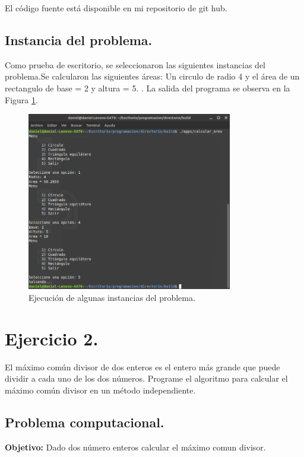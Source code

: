 \documentclass[12pt,letterpaper]{article}
\begin{document}
{El código fuente está disponible en mi repositorio de git hub. \cite{url:calcular_area}

\subsection{Instancia del problema.}
Como prueba de escritorio, se seleccionaron las siguientes instancias del problema.Se calcularon las siguientes \'areas: Un circulo de radio 4 y el \'area de un rectangulo de base = 2 y altura = 5. . La salida del programa se observa en la Figura \ref{fig:calcular_area}.
\begin{figure}[ht!]
  \centering
  \includegraphics[width=0.8\textwidth]{figures/calcular_area}
  \caption{Ejecución de algunas instancias del problema.}
  \label{fig:calcular_area}
\end{figure}

\newpage

\section{Ejercicio 2.}

El m\'aximo com\'un divisor de dos enteros es el entero m\'as grande que puede dividir a cada uno de los dos n\'umeros. Programe el algoritmo para calcular el m\'aximo com\'un divisor en un m\'etodo independiente.

\subsection{Problema computacional.}
\textbf{Objetivo:} Dado dos n\'umero enteros calcular el m\'aximo comun divisor.

}
\end{document}
